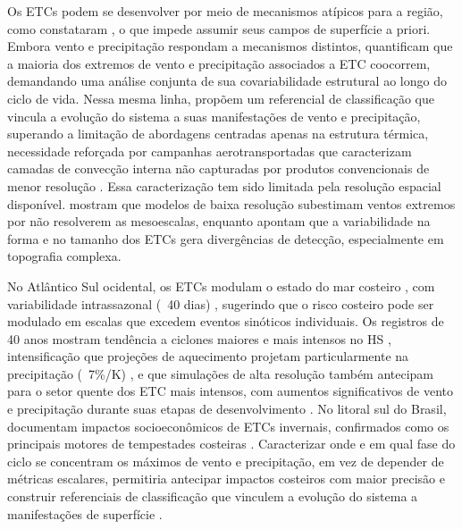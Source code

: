 Os ETCs podem se desenvolver por meio de mecanismos atípicos para a região, como constataram \citet{gozzo2013air,reboita2022from}, o que impede assumir seus campos de superfície a priori.
Embora vento e precipitação respondam a mecanismos distintos, \citet{chen2025characteristics} quantificam que a maioria dos extremos de vento e precipitação associados a ETC coocorrem, demandando uma análise conjunta de sua covariabilidade estrutural ao longo do ciclo de vida.
Nessa mesma linha, \citet{han2025system} propõem um referencial de classificação que vincula a evolução do sistema a suas manifestações de vento e precipitação, superando a limitação de abordagens centradas apenas na estrutura térmica, necessidade reforçada por campanhas aerotransportadas que caracterizam camadas de convecção interna não capturadas por produtos convencionais de menor resolução \citep{kaylee2025convection}.
Essa caracterização tem sido limitada pela resolução espacial disponível. \citet{priestley2022improved} mostram que modelos de baixa resolução subestimam ventos extremos por não resolverem as mesoescalas, enquanto \citet{neu2013intercomparison} apontam que a variabilidade na forma e no tamanho dos ETCs gera divergências de detecção, especialmente em topografia complexa.

No Atlântico Sul ocidental, os ETCs modulam o estado do mar costeiro \citep{gramcianinov2023impact}, com variabilidade intrassazonal (~40 dias) \citep{sasaki2021intraseasonal}, sugerindo que o risco costeiro pode ser modulado em escalas que excedem eventos sinóticos individuais.
Os registros de 40 anos mostram tendência a ciclones maiores e mais intensos no HS \citep{simmonds2000variability}, intensificação que projeções de aquecimento projetam particularmente na precipitação (~7\%/K) \citep{kodama2019perspective}, e que simulações de alta resolução também antecipam para o setor quente dos ETC mais intensos, com aumentos significativos de vento e precipitação durante suas etapas de desenvolvimento \citep{gentile2025response}.
No litoral sul do Brasil, \citet{bartolomei2024extremos} documentam impactos socioeconômicos de ETCs invernais, confirmados como os principais motores de tempestades costeiras \citep{miranda2026patterns,bitencourt2010relating}.
Caracterizar onde e em qual fase do ciclo se concentram os máximos de vento e precipitação, em vez de depender de métricas escalares, permitiria antecipar impactos costeiros com maior precisão e construir referenciais de classificação que vinculem a evolução do sistema a manifestações de superfície \citep{han2025system}.

